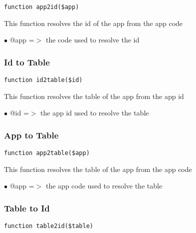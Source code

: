 \documentclass[a4paper]{article}
\begin{document}
\begin{lstlisting}
function app2id($app)
\end{lstlisting}

This function resolves the id of the app from the app code

\begin{compactitem}
\item[\color{myblue}$\bullet$] @app =$>$ the code used to resolve the id
\end{compactitem}

\hypertarget{toc20}{}
\subsubsection{Id to Table}

\begin{lstlisting}
function id2table($id)
\end{lstlisting}

This function resolves the table of the app from the app id

\begin{compactitem}
\item[\color{myblue}$\bullet$] @id =$>$ the app id used to resolve the table
\end{compactitem}

\hypertarget{toc21}{}
\subsubsection{App to Table}

\begin{lstlisting}
function app2table($app)
\end{lstlisting}

This function resolves the table of the app from the app code

\begin{compactitem}
\item[\color{myblue}$\bullet$] @app =$>$ the app code used to resolve the table
\end{compactitem}

\hypertarget{toc22}{}
\subsubsection{Table to Id}

\begin{lstlisting}
function table2id($table)
\end{lstlisting}
\end{document}

